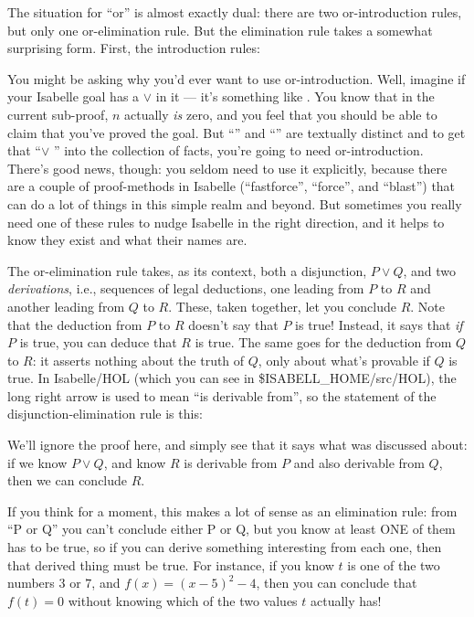 The situation for ``or'' is almost exactly dual: there are two or-introduction rules, but only one or-elimination rule. But the elimination rule takes a somewhat surprising form. First, the introduction rules:

\begin{prooftree}
\end{prooftree}

\begin{prooftree}
\end{prooftree}

You might be asking why you'd ever want to use or-introduction. Well, imagine if your Isabelle goal has a  $ \vee $ in it --- it's something like . You know that in the current sub-proof, $n$ actually \textit{is} zero, and you feel that you should be able to claim that you've proved the goal. But ``'' and ``'' are textually distinct and to get that ``$\vee$ '' into the collection of facts, you're going to need or-introduction. There's good news, though: you seldom need to use it explicitly, because there are a couple of proof-methods in Isabelle (``fastforce'', ``force'', and ``blast'') that can do a lot of things in this simple realm and beyond. But sometimes you really need one of these rules to nudge Isabelle in the right direction, and it helps to know they exist and what their names are. 

The or-elimination rule takes, as its context, both a disjunction, $P \vee Q$, and two \textit{derivations}, i.e., sequences of legal deductions, one leading from $P$ to $R$ and another leading from $Q$ to $R$. These, taken together, let you conclude $R$. Note that the deduction from $P$ to $R$ doesn't say that $P$ is true! Instead, it says that \textit{if} $P$ is true, you can deduce that $R$ is true. The same goes for the deduction from $Q$ to $R$: it asserts nothing about the truth of $Q$, only about what's provable if $Q$ is true. In Isabelle/HOL (which you can see in \$ISABELL\_HOME/src/HOL), the long right arrow is used to mean ``is derivable from'', so the statement of the disjunction-elimination rule is this:


We'll ignore the proof here, and simply see that it says what was discussed about: if we know $P \vee Q$, and know $R$ is derivable from $P$ and also derivable from $Q$, then we can conclude $R$. 

If you think for a moment, this makes a lot of sense as an elimination rule: from ``P or Q'' you can't conclude either P or Q, but you know at least ONE of them has to be true, so if you can derive something interesting from each one, then that derived thing must be true. For instance, if you know $t$ is one of the two numbers $3$ or $7$, and $f(x) = (x-5)^2 - 4$, then you can conclude that $f(t) = 0$ without knowing which of the two values $t$ actually has!

